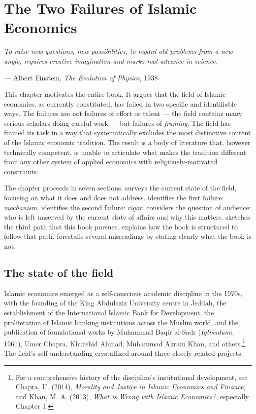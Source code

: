 \chapter{The Two Failures of Islamic Economics}
\label{ch:two-failures}

\epigraph{\itshape To raise new questions, new possibilities, to regard
old problems from a new angle, requires creative imagination and
marks real advance in science.}{--- Albert Einstein, \textit{The
Evolution of Physics}, 1938}

\noindent
This chapter motivates the entire book. It argues that the field of
Islamic economics, as currently constituted, has failed in two
specific and identifiable ways. The failures are not failures of
effort or talent --- the field contains many serious scholars doing
careful work --- but failures of \emph{framing}. The field has framed
its task in a way that systematically excludes the most distinctive
content of the Islamic economic tradition. The result is a body of
literature that, however technically competent, is unable to
articulate what makes the tradition different from any other system
of applied economics with religiously-motivated constraints.

The chapter proceeds in seven sections. 
surveys the current state of the field, focusing on what it does and
does not address.  identifies the first
failure: \emph{mechanism}.  identifies the
second failure: \emph{rigor}.  considers the
question of audience: who is left unserved by the current state of
affairs and why this matters.  sketches the
third path that this book pursues.  explains how
the book is structured to follow that path.  forestalls
several misreadings by stating clearly what the book is not.

\section{The state of the field}
\label{sec:state-of-field}

Islamic economics emerged as a self-conscious academic discipline in
the 1970s, with the founding of the King Abdulaziz University centre
in Jeddah, the establishment of the International Islamic Bank for
Development, the proliferation of Islamic banking institutions across
the Muslim world, and the publication of foundational works by
Muhammad Baqir al-Sadr (\emph{Iqtisaduna}, 1961), Umer Chapra,
Khurshid Ahmad, Muhammad Akram Khan, and others.\footnote{For a
comprehensive history of the discipline's institutional development,
see Chapra, U. (2014), \emph{Morality and Justice in Islamic
Economics and Finance}, and Khan, M. A. (2013), \emph{What is Wrong
with Islamic Economics?}, especially Chapter 1.} The field's
self-understanding crystallized around three closely related
projects.


